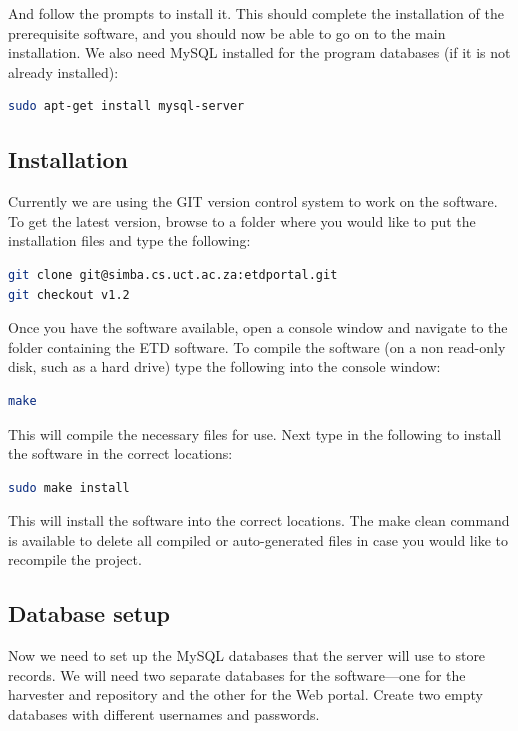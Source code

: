 \documentclass[a4paper,11pt]{article}
\begin{document}
And follow the prompts to install it. This should complete the installation of the prerequisite software, and you should now be able to go on to the main installation. We also need MySQL installed for the program databases (if it is not already installed): 

\begin{lstlisting}[language=bash]
 sudo apt-get install mysql-server
\end{lstlisting}

\subsection{Installation}

Currently we are using the GIT version control system to work on the software. To get the latest version, browse to a folder where you would like to put the installation files and type the following:

\begin{lstlisting}[language=bash]
git clone git@simba.cs.uct.ac.za:etdportal.git 
git checkout v1.2
\end{lstlisting}

Once you have the software available, open a console window and navigate to the folder containing the ETD software. To compile the software (on a non read-only disk, such as a hard drive) type the following into the console window: 

\begin{lstlisting}[language=bash]
 make
\end{lstlisting}

This will compile the necessary files for use. Next type in the following to install the software in the correct locations: 

\begin{lstlisting}[language=bash]
 sudo make install
\end{lstlisting}

This will install the software into the correct locations. The make clean command is available to delete all compiled or auto-generated files in case you would like to recompile the project.

\subsection{Database setup}

Now we need to set up the MySQL databases that the server will use to store records. We will need two separate databases for the software---one for the harvester and repository and the other for the Web portal. Create two empty databases with different usernames and passwords. 
\end{document}
